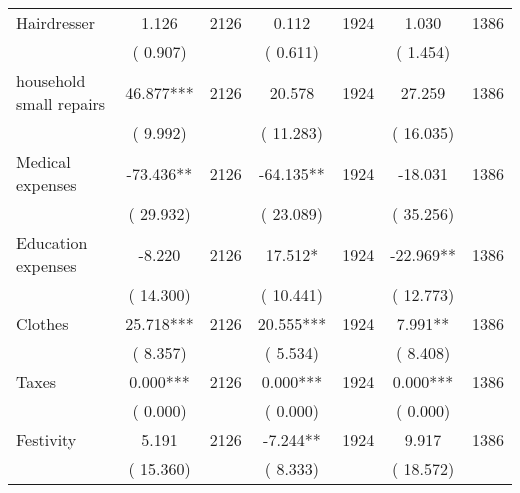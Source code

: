 \begin{tabular}{l*{6}{c}}
Hairdresser        &              1.126      &       2126       &              0.112      &       1924       &              1.030      &       1386       \\
                       &       (       0.907)            &                               &       (       0.611)            &                               &       (       1.454)            &                               \\
household small repairs        &             46.877***      &       2126       &             20.578      &       1924       &             27.259      &       1386       \\
                       &       (       9.992)            &                               &       (      11.283)            &                               &       (      16.035)            &                               \\
Medical expenses        &            -73.436**      &       2126       &            -64.135**      &       1924       &            -18.031      &       1386       \\
                       &       (      29.932)            &                               &       (      23.089)            &                               &       (      35.256)            &                               \\
Education expenses        &             -8.220      &       2126       &             17.512*      &       1924       &            -22.969**      &       1386       \\
                       &       (      14.300)            &                               &       (      10.441)            &                               &       (      12.773)            &                               \\
Clothes        &             25.718***      &       2126       &             20.555***      &       1924       &              7.991**      &       1386       \\
                       &       (       8.357)            &                               &       (       5.534)            &                               &       (       8.408)            &                               \\
Taxes        &              0.000***      &       2126       &              0.000***      &       1924       &              0.000***      &       1386       \\
                       &       (       0.000)            &                               &       (       0.000)            &                               &       (       0.000)            &                               \\
Festivity        &              5.191      &       2126       &             -7.244**      &       1924       &              9.917      &       1386       \\
                       &       (      15.360)            &                               &       (       8.333)            &                               &       (      18.572)            &                               \\
\hline \end{tabular}